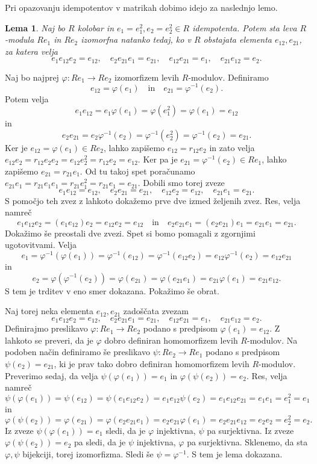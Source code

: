 \documentclass[a4paper, 12pt]{amsart}
\theoremstyle{definition} %
\theoremstyle{plain} %
\newtheorem{lema}[definicija]{Lema}
\begin{document}
Pri opazovanju idempotentov v matrikah dobimo idejo za naslednjo lemo.

\begin{lema}
\label{izomorfniPodmoduliElementi}
Naj bo $R$ kolobar in $e_1 = e_1^2 , e_2=e_2^2\in R$ idempotenta. Potem sta leva $R$-modula $Re_1$ in $Re_2$ izomorfna natanko tedaj, ko v $R$ obstajata elementa $e_{12}, e_{21}$, za katera velja
$$
e_1 e_{12} e_2 = e_{12}, \quad e_2 e_{21} e_1 = e_{21}, \quad e_{12}e_{21} = e_1, \quad e_{21}e_{12} = e_2.
$$
\end{lema}

\proof
Naj bo najprej $\varphi : Re_1 \rightarrow Re_2$ izomorfizem levih $R$-modulov. Definiramo 
$$
e_{12} = \varphi(e_1) \quad \text{in} \quad e_{21} = \varphi^{-1}(e_2).
$$
Potem velja 
$$
e_1 e_{12} = e_1\varphi(e_1) = \varphi(e_1^2) = \varphi(e_1) = e_{12}
$$
in
$$
e_2 e_{21} = e_2\varphi^{-1}(e_2) = \varphi^{-1}(e_2^2) = \varphi^{-1}(e_2) = e_{21}.
$$
Ker je $e_{12} = \varphi (e_1) \in Re_2$, lahko zapišemo $e_{12} = r_{12}e_2$ in zato velja $e_{12}e_2 = r_{12}e_2 e_2 = e_{12}e_2^2 = r_{12}e_2 = e_{12}$. Ker pa je $e_{21} = \varphi^{-1}(e_2) \in Re_1$, lahko zapišemo $e_{21} = r_{21}e_1$. Od tu takoj spet poračunamo $e_{21}e_1 = r_{21}e_1e_1 = r_{21}e_1^2 = r_{21}e_1=e_{21}$. Dobili smo torej zveze
$$
e_1e_{12} = e_{12},\quad  e_2 e_{21} = e_{21}, \quad e_{12} e_2 = e_{12}, \quad e_{21} e_1 = e_{21}.
$$
S pomočjo teh zvez z lahkoto dokažemo prve dve izmed željenih zvez. Res, velja namreč 
$$
e_1 e_{12} e_2 = (e_1 e_{12}) e_2 = e_{12} e_2 = e_{12}\quad \text{in}\quad e_2 e_{21}e_1 = (e_2 e_{21}) e_1 = e_{21}e_1 = e_{21}.
$$
Dokažimo še preostali dve zvezi. Spet si bomo pomagali z zgornjimi ugotovitvami. Velja
$$
e_1 = \varphi^{-1}(\varphi(e_1)) = \varphi^{-1}(e_{12}) = \varphi^{-1}(e_{12} e_2) = e_{12} \varphi^{-1}(e_2) = e_{12} e_{21}
$$
in
$$
e_2 = \varphi(\varphi^{-1}(e_2)) = \varphi(e_{21}) = \varphi(e_{21}e_1)=e_{21}\varphi(e_1) = e_{21} e_{12}.
$$
S tem je trditev v eno smer dokazana. Pokažimo še obrat.

Naj torej neka elementa $e_{12}, e_{21}$ zadoščata zvezam
$$
e_1 e_{12} e_2 = e_{12}, \quad e_2 e_{21} e_1 = e_{21}, \quad e_{12}e_{21} = e_1, \quad e_{21}e_{12} = e_2.
$$
Definirajmo preslikavo $\varphi : Re_1 \rightarrow Re_2$ podano s predpisom $\varphi(e_1) = e_{12}$. Z lahkoto se preveri, da je $\varphi$ dobro definiran homomorfizem levih $R$-modulov. Na podoben način definiramo še preslikavo $\psi:Re_2 \rightarrow Re_1$ podano s predpisom $\psi(e_2) = e_{21}$, ki je prav tako dobro definiran homomorfizem levih $R$-modulov.
Preverimo sedaj, da velja $\psi(\varphi(e_1)) = e_1$ in $\varphi(\psi(e_2)) = e_2$. Res, velja namreč
$$
\psi(\varphi(e_1)) = \psi(e_{12}) = \psi(e_1 e_{12}e_2) = e_1 e_{12}\psi(e_2) = e_1 e_{12} e_{21} = e_1 e_1 = e_1^2 = e_1
$$
in
$$
\varphi(\psi(e_2)) = \varphi(e_{21}) = \varphi(e_2 e_{21} e_1) = e_2 e_{21} \varphi(e_1) = e_2 e_{21} e_{12} = e_2 e_2 = e_2^2 = e_2. 
$$
Iz zveze $\psi(\varphi(e_1)) = e_1$ sledi, da je $\varphi$ injektivna, $\psi$ pa surjektivna. Iz zveze $\varphi(\psi(e_2)) = e_2$ pa sledi, da je $\psi$ injektivna, $\varphi$ pa surjektivna. Sklenemo, da sta $\varphi, \psi$ bijekciji, torej izomorfizma. Sledi še $\psi = \varphi^{-1}$. S tem je lema dokazana.
\endproof
\end{document}
